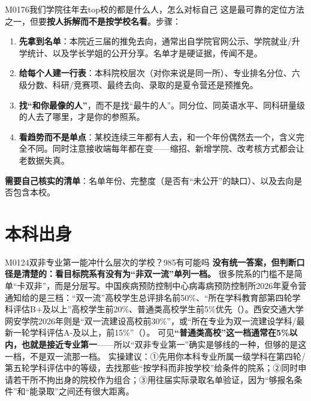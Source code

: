 \begin{qa}{M0176}{我们学院往年去top校的都是什么人，怎么对标自己}
这是最可靠的定位方法之一，但要\textbf{按人拆解而不是按学校名看}。步骤：
\begin{enumerate}
  \item \textbf{先拿到名单}：本院近三届的推免去向，通常出自学院官网公示、学院就业/升学统计、以及学长学姐的公开分享。名单才是硬证据，传闻不是。
  \item \textbf{给每个人建一行表}：本科院校层次（对你来说是同一所）、专业排名分位、六级分数、科研/竞赛项、最终去向、录取的是夏令营还是预推免。
  \item \textbf{找“和你最像的人”}，而不是找“最牛的人”。同分位、同英语水平、同科研量级的人去了哪里，才是你的参照系。
  \item \textbf{看趋势而不是单点}：某校连续三年都有人去，和一个年份偶然去一个，含义完全不同。同时注意接收端每年都在变——缩招、新增学院、改考核方式都会让老数据失真。
\end{enumerate}
\textbf{需要自己核实的清单}：名单年份、完整度（是否有“未公开”的缺口）、以及去向是否包含本校。
\end{qa}

\section{本科出身}
\begin{qa}{M0124}{双非专业第一能冲什么层次的学校？985有可能吗}
\textbf{没有统一答案，但判断口径是清楚的：看目标院系有没有为“非双一流”单列一档。}
很多院系的门槛不是简单“卡双非”，而是分层写。中国疾病预防控制中心病毒病预防控制所2026年夏令营通知给的是三档：“双一流”高校学生总评排名前50\%、“所在学科教育部第四轮学科评估B+及以上”高校学生前20\%、普通类高校学生前5\%优先（）。西安交通大学网安学院2026年则是“双一流建设高校前30\%”，或“所在专业为双一流建设学科/最新一轮学科评估A-及以上，前15\%”（）。
可见\textbf{“普通类高校”这一档通常在5\%以内，也就是接近专业第一}——所以“双非专业第一”确实是够线的一种，但够的是这一档，不是双一流那一档。
实操建议：①先用你本科专业所属一级学科在第四轮/第五轮学科评估中的等级，去找那些“按学科而非按学校”给条件的院系；②同时申请若干所不拘出身的院校作为组合；③用往届实际录取名单验证，因为“够报名条件”和“能录取”之间还有很大距离。
\end{qa}

